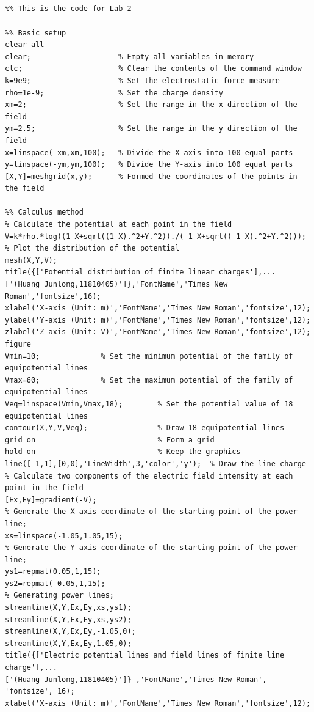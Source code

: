 \documentclass[journal,twocolumn,letterpaper]{IEEEJERM}
\begin{document}


\newpage
\onecolumn 
\begin{appendices}
\section{}
\end{appendices}

\begin{lstlisting}
%% This is the code for Lab 2

%% Basic setup
clear all
clear;                    % Empty all variables in memory
clc;                      % Clear the contents of the command window
k=9e9;                    % Set the electrostatic force measure
rho=1e-9;                 % Set the charge density
xm=2;                     % Set the range in the x direction of the field
ym=2.5;                   % Set the range in the y direction of the field
x=linspace(-xm,xm,100);   % Divide the X-axis into 100 equal parts
y=linspace(-ym,ym,100);   % Divide the Y-axis into 100 equal parts
[X,Y]=meshgrid(x,y);      % Formed the coordinates of the points in the field

%% Calculus method
% Calculate the potential at each point in the field
V=k*rho.*log((1-X+sqrt((1-X).^2+Y.^2))./(-1-X+sqrt((-1-X).^2+Y.^2)));
% Plot the distribution of the potential
mesh(X,Y,V);
title({['Potential distribution of finite linear charges'],...
['(Huang Junlong,11810405)']},'FontName','Times New Roman','fontsize',16); 
xlabel('X-axis (Unit: m)','FontName','Times New Roman','fontsize',12);   
ylabel('Y-axis (Unit: m)','FontName','Times New Roman','fontsize',12);   
zlabel('Z-axis (Unit: V)','FontName','Times New Roman','fontsize',12);  
figure
Vmin=10;              % Set the minimum potential of the family of equipotential lines
Vmax=60;              % Set the maximum potential of the family of equipotential lines
Veq=linspace(Vmin,Vmax,18);        % Set the potential value of 18 equipotential lines
contour(X,Y,V,Veq);                % Draw 18 equipotential lines
grid on                            % Form a grid
hold on                            % Keep the graphics
line([-1,1],[0,0],'LineWidth',3,'color','y');  % Draw the line charge
% Calculate two components of the electric field intensity at each point in the field
[Ex,Ey]=gradient(-V); 
% Generate the X-axis coordinate of the starting point of the power line;
xs=linspace(-1.05,1.05,15);
% Generate the Y-axis coordinate of the starting point of the power line;
ys1=repmat(0.05,1,15);
ys2=repmat(-0.05,1,15);
% Generating power lines;
streamline(X,Y,Ex,Ey,xs,ys1);
streamline(X,Y,Ex,Ey,xs,ys2);
streamline(X,Y,Ex,Ey,-1.05,0);
streamline(X,Y,Ex,Ey,1.05,0);
title({['Electric potential lines and field lines of finite line charge'],...
['(Huang Junlong,11810405)']} ,'FontName','Times New Roman', 'fontsize', 16);      
xlabel('X-axis (Unit: m)','FontName','Times New Roman','fontsize',12);  


\end{lstlisting}
\end{document}
